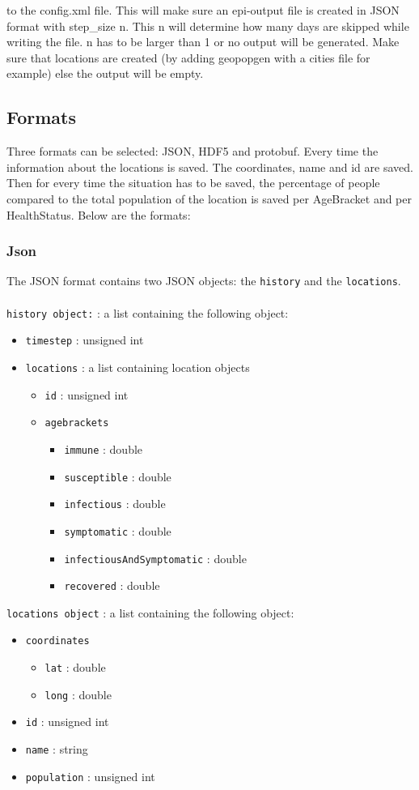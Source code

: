 to the config.xml file. This will make sure an epi-output file is created in JSON format with step\_size n. This n will determine how many days are skipped while writing the file. n has to be larger than 1 or no output will be generated. Make sure that locations are created (by adding geopopgen with a cities file for example) else the output will be empty. 

\subsection{Formats}
Three formats can be selected: JSON, HDF5 and protobuf. Every time the information about the locations is saved. The coordinates, name and id are saved. Then for every time the situation has to be saved, the percentage of people compared to the total population of the location is saved per AgeBracket and per HealthStatus. Below are the formats:
\subsubsection{Json}
The JSON format contains two JSON objects: the \texttt{history} and the \texttt{locations}.
\\\\
\texttt{history object:} : a list containing the following object:
\begin{itemize}
\item \texttt{timestep} : unsigned int
\item \texttt{locations} : a list containing location objects
\begin{itemize}
\item \texttt{id} : unsigned int
\item \texttt{agebrackets}
\begin{itemize}
\item \texttt{immune} 		: double
\item \texttt{susceptible} 	: double
\item \texttt{infectious} 	: double
\item \texttt{symptomatic} 	: double
\item \texttt{infectiousAndSymptomatic} 	: double
\item \texttt{recovered} 	: double
\end{itemize}
\end{itemize}
\end{itemize}

\texttt{locations object} : a list containing the following object:
\begin{itemize}
\item \texttt{coordinates}
\begin{itemize}
\item \texttt{lat} : double
\item \texttt{long} : double
\end{itemize}
\item \texttt{id} : unsigned int
\item \texttt{name} : string
\item \texttt{population} : unsigned int
\end{itemize}

